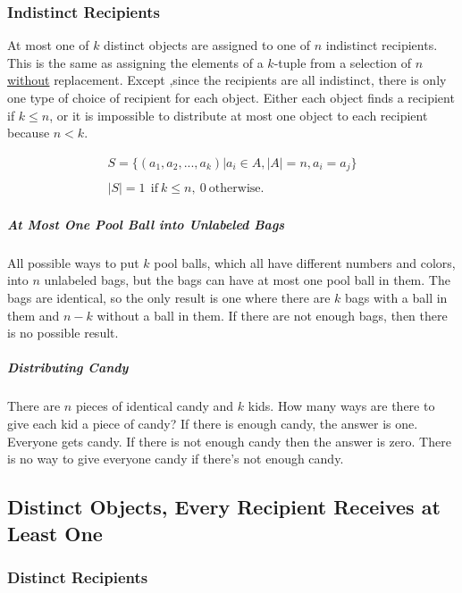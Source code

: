 \subsubsection{Indistinct Recipients}
At most one of $k$ distinct objects are assigned to one of $n$ indistinct recipients. This is the same as assigning the elements of a $k$-tuple from a selection of $n$ \underline{without} replacement. Except ,since the recipients are all indistinct, there is only one type of choice of recipient for each object. Either each object finds a recipient if $k\leq n$, or it is impossible to distribute at most one object to each recipient because $n < k$.

\begin{equation}
\begin{array}{l}
S = \{ (a_1,a_2,...,a_k) | a_i \in A, |A| = n, a_i=a_j\}\\
\\
|S| = 1\ \ \mathrm{if\ }k\leq n,\ 0\ \mathrm{otherwise.}
\end{array}
\end{equation}



\subparagraph{At Most One Pool Ball into Unlabeled Bags} All possible ways to put $k$ pool balls, which all have different numbers and colors, into $n$ unlabeled bags, but the bags can have at most one pool ball in them. The bags are identical, so the only result is one where there are $k$ bags with a ball in them and $n-k$ without a ball in them. If there are not enough bags, then there is no possible result. 

\subparagraph{Distributing Candy} There are $n$ pieces of identical candy and $k$ kids. How many ways are there to give each kid a piece of candy? If there is enough candy, the answer is one. Everyone gets candy. If there is not enough candy then the answer is zero. There is no way to give everyone candy if there's not enough candy.


\subsection{Distinct Objects, Every Recipient Receives at Least One}

\subsubsection{Distinct Recipients}

